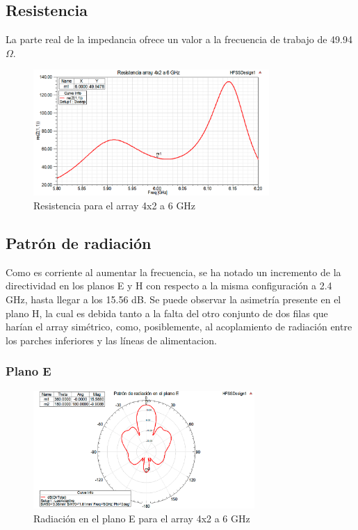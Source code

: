 \subsection{Resistencia}
\par La parte real de la impedancia ofrece un valor a la frecuencia de trabajo de 49.94 $\Omega$.
\\
\begin{figure}[H]
    \centering
        \includegraphics[width=0.8\textwidth]{archivos/analisis/4x22/3}
        \caption{Resistencia para el array 4x2 a 6 GHz}
        \label{fig:resis4x22}
\end{figure}

\subsection{Patrón de radiación}
\par Como es corriente al aumentar la frecuencia, se ha notado un incremento de la directividad en los planos E y H con respecto a la misma configuración a 2.4 GHz, hasta llegar a los 15.56 dB. Se puede observar la asimetría presente en el plano H, la cual es debida tanto a la falta del otro conjunto de dos filas que harían el array simétrico, como, posiblemente, al acoplamiento de radiación entre los parches inferiores y las líneas de alimentacion.
\\
\subsubsection{Plano E}
\begin{figure}[H]
    \centering
        \includegraphics[width=0.75\textwidth]{archivos/analisis/4x22/4}
        \caption{Radiación en el plano E para el array 4x2 a 6 GHz}
        \label{fig:E4x22}
\end{figure}


